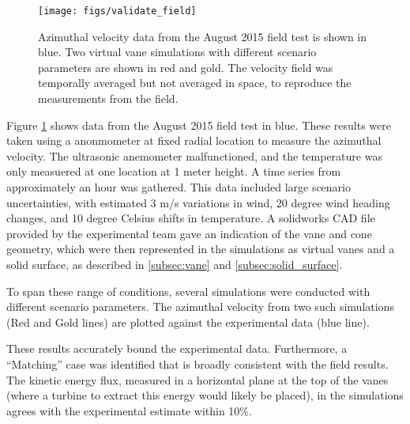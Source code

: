  \begin{figure}[!htb]
  \begin{center}
   \texttt{[image: figs/validate\_field]}
   \caption{Azimuthal velocity data from the August 2015 field test is
   shown in blue. Two virtual vane simulations with different scenario
   parameters are shown in red and gold. The velocity field was
   temporally averaged but not averaged in space, to reproduce
   the measurements from the field.}
   \label{fig:field_val}
  \end{center}
 \end{figure}
%
%

Figure \ref{fig:field_val} shows data from the August 2015 field test in
blue. These results were taken using a anonmometer at fixed radial
location to measure the azimuthal velocity. The ultrasonic anemometer
malfunctioned, and the temperature was only measuered at one location at
1 meter height. A time series from approximately an hour was gathered. 
This data included large scenario uncertainties, with estimated 3
m/s variations in wind, 20 degree wind heading changes, and 10 degree
Celsius shifts in temperature. A solidworks CAD file provided by the
experimental team gave an indication of the vane and cone geometry,
which were then represented in the simulations as virtual vanes and a
solid surface, as described in \ref{subsec:vane} and
\ref{subsec:solid_surface}.  

To span these range of conditions, several simulations were conducted
with different scenario parameters. The azimuthal velocity from two such
simulations (Red and Gold lines) are plotted against the experimental
data (blue line).  

These results accurately bound the experimental data. Furthermore, a
``Matching'' case was identified that is broadly consistent with the
field results. The kinetic energy flux, measured in a horizontal plane
at the top of the vanes (where a turbine to extract this energy would
likely be placed), in the simulations agrees with the experimental
estimate within 10\%. 


%
% 
%
% 
%
%
%
%
